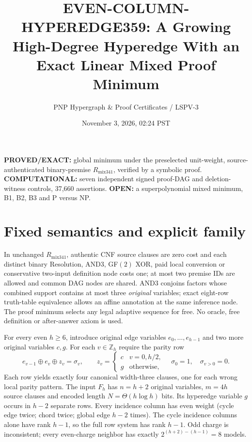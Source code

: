 \documentclass[11pt]{article}
\title{EVEN-COLUMN-HYPEREDGE359: A Growing High-Degree Hyperedge With an Exact Linear Mixed Proof Minimum}
\author{PNP Hypergraph \& Proof Certificates / LSPV-3}
\date{November 3, 2026, 02:24 PST}
\begin{document}
\maketitle
\noindent\textbf{PROVED/EXACT:} global minimum under the preselected unit-weight, source-authenticated binary-premise $R_{\mathrm{mix341}}$, verified by a symbolic proof. \textbf{COMPUTATIONAL:} seven independent signed proof-DAG and deletion-witness controls, 37,660 assertions. \textbf{OPEN:} a superpolynomial mixed minimum, B1, B2, B3 and P versus NP.

\section*{Fixed semantics and explicit family}
In unchanged $R_{\mathrm{mix341}}$, authentic CNF source clauses are zero cost and each distinct binary Resolution, AND3, GF$(2)$ XOR, paid local conversion or conservative two-input definition node costs one; at most two premise IDs are allowed and common DAG nodes are shared. AND3 conjoins factors whose combined support contains at most three \emph{original} variables; exact eight-row truth-table equivalence allows an affine annotation at the same inference node. The proof minimum selects any legal adaptive sequence for free. No oracle, free definition or after-answer axiom is used.

For every even $h\ge6$, introduce original edge variables $e_0,\ldots,e_{h-1}$ and two more original variables $c,g$. For each $v\in\mathbb{Z}_h$ require the parity row
\[
e_{v-1}\oplus e_v\oplus z_v=\sigma_v,\qquad
z_v=\begin{cases}c&v=0,h/2,\\g&\mathrm{otherwise},\end{cases}
\quad \sigma_0=1,\quad \sigma_{v>0}=0.
\]
Each row yields exactly four canonical width-three clauses, one for each wrong local parity pattern. The input $F_h$ has $n=h+2$ original variables, $m=4h$ source clauses and encoded length $N=\Theta(h\log h)$ bits. Its hyperedge variable $g$ occurs in $h-2$ separate rows. Every incidence column has even weight (cycle edge twice; chord twice; global edge $h-2$ times). The cycle incidence columns alone have rank $h-1$, so the full row system has rank $h-1$. Odd charge is inconsistent; every even-charge neighbor has exactly $2^{(h+2)-(h-1)}=8$ models.
\end{document}
